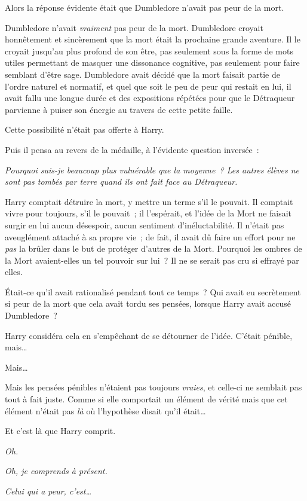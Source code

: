 Alors la réponse évidente était que Dumbledore n'avait pas peur de la mort.

Dumbledore n'avait \emph{vraiment} pas peur de la mort. Dumbledore croyait honnêtement et sincèrement que la mort était la prochaine grande aventure. Il le croyait jusqu'au plus profond de son être, pas seulement sous la forme de mots utiles permettant de masquer une dissonance cognitive, pas seulement pour faire semblant d'être sage. Dumbledore avait décidé que la mort faisait partie de l'ordre naturel et normatif, et quel que soit le peu de peur qui restait en lui, il avait fallu une longue durée et des expositions répétées pour que le Détraqueur parvienne à puiser son énergie au travers de cette petite faille.

Cette possibilité n'était pas offerte à Harry.

Puis il pensa au revers de la médaille, à l'évidente question inversée~:

\emph{Pourquoi suis-je beaucoup plus vulnérable que la moyenne~? Les autres élèves ne sont pas tombés par terre quand ils ont fait face au Détraqueur.}

Harry comptait détruire la mort, y mettre un terme s'il le pouvait. Il comptait vivre pour toujours, s'il le pouvait~; il l'espérait, et l'idée de la Mort ne faisait surgir en lui aucun désespoir, aucun sentiment d'inéluctabilité. Il n'était pas aveuglément attaché à sa propre vie~; de fait, il avait dû faire un effort pour ne \emph{pas} la brûler dans le but de protéger d'autres de la Mort. Pourquoi les ombres de la Mort avaient-elles un tel pouvoir sur lui~? Il ne se serait pas cru si effrayé par elles.

Était-ce qu'il avait rationalisé pendant tout ce temps~? Qui avait eu secrètement si peur de la mort que cela avait tordu ses pensées, lorsque Harry avait accusé Dumbledore~?

Harry considéra cela en s'empêchant de se détourner de l'idée. C'était pénible, mais…

Mais…

Mais les pensées pénibles n'étaient pas toujours \emph{vraies}, et celle-ci ne semblait pas tout à fait juste. Comme si elle comportait un élément de vérité mais que cet élément n'était pas \emph{là} où l'hypothèse disait qu'il était…

Et c'est là que Harry comprit.

\emph{Oh.}

\emph{Oh, je comprends à présent.}

\emph{Celui qui a peur, c'est…}

